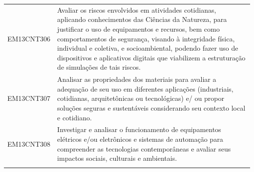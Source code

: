 \documentclass[12pt]{extarticle}
\begin{document}
\begin{longtable}{ll}
EM13CNT306 & Avaliar os riscos envolvidos em atividades cotidianas, aplicando conhecimentos das Ciências da Natureza, para justificar o uso de equipamentos e recursos, bem como comportamentos de segurança, visando à integridade física, individual e coletiva, e socioambiental, podendo fazer uso de dispositivos e aplicativos digitais que viabilizem a estruturação de simulações de tais riscos.                                                                                                                                                                                                                                                                                                                                                                                                                          \\
\rowcolor[HTML]{FFF} 
EM13CNT307 & Analisar as propriedades dos materiais para avaliar a adequação de seu uso em diferentes aplicações (industriais, cotidianas, arquitetônicas ou tecnológicas) e/ ou propor soluções seguras e sustentáveis considerando seu contexto local e cotidiano.                                                                                                                                                                                                                                                                                                                                                                                                                                                                                                                                                               \\
\rowcolor[HTML]{E0F7FA} 
EM13CNT308 & Investigar e analisar o funcionamento de equipamentos elétricos e/ou eletrônicos e sistemas de automação para compreender as tecnologias contemporâneas e avaliar seus impactos sociais, culturais e ambientais.                                                                                                                                                                                                                                                                                                                                                                                                                                                                                                                                                                                                      \\
\rowcolor[HTML]{FFF} 

\end{longtable}
\end{document}
